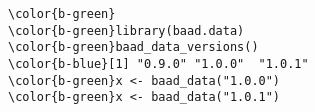 \documentclass[class=minimal,border=0]{standalone}
\begin{document}
%
\begin{BVerbatim}[bgcolor=b-darkgrey]
\color{b-green}
\color{b-green}library(baad.data)
\color{b-green}baad_data_versions()
\color{b-blue}[1] "0.9.0" "1.0.0"  "1.0.1"
\color{b-green}x <- baad_data("1.0.0")
\color{b-green}x <- baad_data("1.0.1")
\end{BVerbatim}
\end{document}
